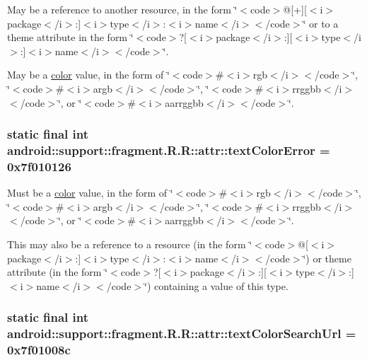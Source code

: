 May be a reference to another resource, in the form \char`\"{}$<$code$>$@\mbox{[}+\mbox{]}\mbox{[}$<$i$>$package$<$/i$>$:\mbox{]}$<$i$>$type$<$/i$>$:$<$i$>$name$<$/i$>$$<$/code$>$\char`\"{} or to a theme attribute in the form \char`\"{}$<$code$>$?\mbox{[}$<$i$>$package$<$/i$>$:\mbox{]}\mbox{[}$<$i$>$type$<$/i$>$:\mbox{]}$<$i$>$name$<$/i$>$$<$/code$>$\char`\"{}. 

May be a \hyperlink{classandroid_1_1support_1_1fragment_1_1_r_1_1color}{color} value, in the form of \char`\"{}$<$code$>$\#$<$i$>$rgb$<$/i$>$$<$/code$>$\char`\"{}, \char`\"{}$<$code$>$\#$<$i$>$argb$<$/i$>$$<$/code$>$\char`\"{}, \char`\"{}$<$code$>$\#$<$i$>$rrggbb$<$/i$>$$<$/code$>$\char`\"{}, or \char`\"{}$<$code$>$\#$<$i$>$aarrggbb$<$/i$>$$<$/code$>$\char`\"{}. \hypertarget{classandroid_1_1support_1_1fragment_1_1_r_1_1attr_7751ea5f1c3dbfbf62644807e15192f1}{
\subsubsection[{textColorError}]{\setlength{\rightskip}{0pt plus 5cm}static final int android::support::fragment.R.R::attr::textColorError = 0x7f010126}}
\label{classandroid_1_1support_1_1fragment_1_1_r_1_1attr_7751ea5f1c3dbfbf62644807e15192f1}


Must be a \hyperlink{classandroid_1_1support_1_1fragment_1_1_r_1_1color}{color} value, in the form of \char`\"{}$<$code$>$\#$<$i$>$rgb$<$/i$>$$<$/code$>$\char`\"{}, \char`\"{}$<$code$>$\#$<$i$>$argb$<$/i$>$$<$/code$>$\char`\"{}, \char`\"{}$<$code$>$\#$<$i$>$rrggbb$<$/i$>$$<$/code$>$\char`\"{}, or \char`\"{}$<$code$>$\#$<$i$>$aarrggbb$<$/i$>$$<$/code$>$\char`\"{}. 

This may also be a reference to a resource (in the form \char`\"{}$<$code$>$@\mbox{[}$<$i$>$package$<$/i$>$:\mbox{]}$<$i$>$type$<$/i$>$:$<$i$>$name$<$/i$>$$<$/code$>$\char`\"{}) or theme attribute (in the form \char`\"{}$<$code$>$?\mbox{[}$<$i$>$package$<$/i$>$:\mbox{]}\mbox{[}$<$i$>$type$<$/i$>$:\mbox{]}$<$i$>$name$<$/i$>$$<$/code$>$\char`\"{}) containing a value of this type. \hypertarget{classandroid_1_1support_1_1fragment_1_1_r_1_1attr_d7b8079a4100795699881420df3b06a4}{
\subsubsection[{textColorSearchUrl}]{\setlength{\rightskip}{0pt plus 5cm}static final int android::support::fragment.R.R::attr::textColorSearchUrl = 0x7f01008c}}
\label{classandroid_1_1support_1_1fragment_1_1_r_1_1attr_d7b8079a4100795699881420df3b06a4}


